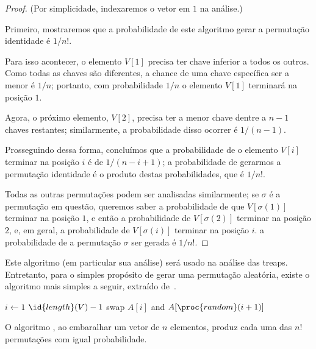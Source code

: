 \begin{proof}
    (Por simplicidade, indexaremos o vetor em $1$ na análise.)

    Primeiro, mostraremos que a probabilidade de este algoritmo
    gerar a permutação identidade é $1/n!$.

    Para isso acontecer,
    o elemento $V[1]$ precisa ter chave inferior a todos os outros.
    Como todas as chaves são diferentes,
    a chance de uma chave específica ser a menor é $1/n$;
    portanto, com probabilidade $1/n$ o elemento $V[1]$ terminará na posição $1$.

    Agora, o próximo elemento, $V[2]$,
    precisa ter a menor chave dentre a $n-1$ chaves restantes;
    similarmente, a probabilidade disso ocorrer é $1/(n-1)$.

    Prosseguindo dessa forma,
    concluímos que a probabilidade de o elemento $V[i]$ terminar na posição $i$
    é de $1/(n-i+1)$;
    a probabilidade de gerarmos a permutação identidade
    é o produto destas probabilidades, que é $1/n!$.

    Todas as outras permutações podem ser analisadas similarmente;
    se $\sigma$ é a permutação em questão,
    queremos saber a probabilidade de que $V[\sigma(1)]$ terminar na posição $1$,
    e então a probabilidade de $V[\sigma(2)]$ terminar na posição $2$,
    e, em geral, a probabilidade de $V[\sigma(i)]$ terminar na posição $i$.
    a probabilidade de a permutação $\sigma$ ser gerada é $1/n!$.
\end{proof}

Este algoritmo
(em particular sua análise)
será usado na análise das treaps.
Entretanto, para o simples propósito de gerar uma permutação aleatória,
existe o algoritmo mais simples a seguir,
extraído de~\cite[p.~357]{SedgewickFlajolet2013}.

\begin{codebox}
    \li \For $i \gets 1$ \To $\id{length}(V) - 1$
    \li \Do
            swap $A[i]$ and $A[\proc{random}(i+1)]$
    \End
\end{codebox}

\begin{proposition}
    O algoritmo ,
    ao embaralhar um vetor de $n$ elementos,
    produz cada uma das $n!$ permutações
    com igual probabilidade.
\end{proposition}

